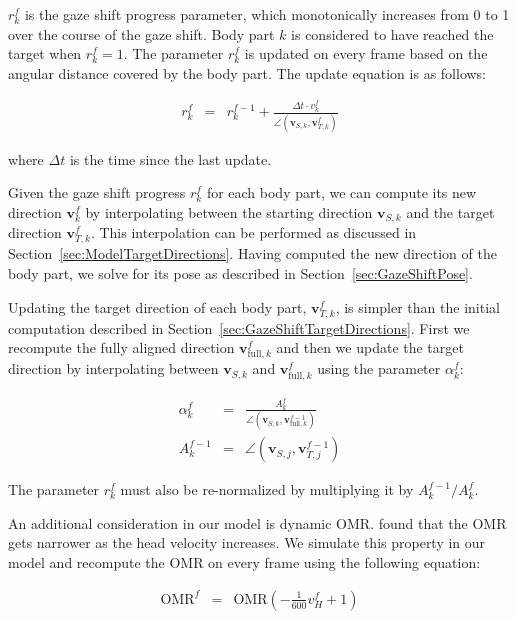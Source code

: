 $r^f_k$ is the gaze shift progress parameter, which monotonically increases from 0 to 1 over the course of the gaze shift. Body part $k$ is considered to have reached the target when $r^f_k = 1$. The parameter $r^f_k$ is updated on every frame based on the angular distance covered by the body part. The update equation is as follows:

\begin{align} \label{eq:RotProgressUpdate}
r^f_k &=& r^{f-1}_k + \frac{\Delta t \cdot v^f_k}{\angle(\mathbf{v}_{S,k}, \mathbf{v}^f_{T,k})}
\end{align}

where $\Delta t$ is the time since the last update.

Given the gaze shift progress $r^f_k$ for each body part, we can compute its new direction $\mathbf{v}^f_k$ by interpolating between the starting direction $\mathbf{v}_{S,k}$ and the target direction $\mathbf{v}^f_{T,k}$. This interpolation can be performed as discussed in Section~\ref{sec:ModelTargetDirections}. Having computed the new direction of the body part, we solve for its pose as described in Section~\ref{sec:GazeShiftPose}.

Updating the target direction of each body part, $\mathbf{v}^f_{T,k}$, is simpler than the initial computation described in Section~\ref{sec:GazeShiftTargetDirections}. First we recompute the fully aligned direction $\mathbf{v}^f_{\mathrm{full},k}$ and then we update the target direction by interpolating between $\mathbf{v}_{S,k}$ and $\mathbf{v}^f_{\mathrm{full},k}$ using the parameter $\alpha^f_k$:

\begin{align}
\label{eq:TargetRotUpdate}
\alpha^f_k &=& \frac{A^f_k}{\angle(\mathbf{v}_{S,k}, \mathbf{v}^{f-1}_{\mathrm{full},k})} \\
A^{f-1}_k &=& \angle(\mathbf{v}_{S,j}, \mathbf{v}^{f-1}_{T,j}) \nonumber
\end{align}

The parameter $r^f_k$ must also be re-normalized by multiplying it by $A^{f-1}_k / A^f_k$.

An additional consideration in our model is dynamic OMR. \citet{guitton1987gaze} found that the OMR gets narrower as the head velocity increases. We simulate this property in our model and recompute the OMR on every frame using the following equation:

\begin{align} \label{eq:OMRUpdate}
\mathrm{OMR}^f &=& \mathrm{OMR} (-\frac{1}{600} v^f_H + 1)
\end{align}

